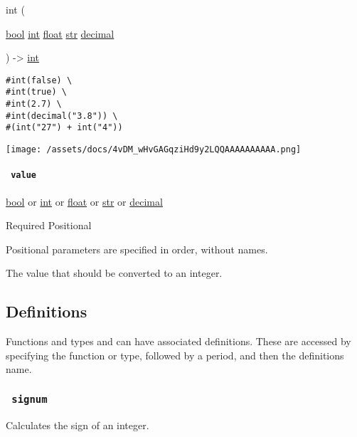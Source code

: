{ int } (

{ \href{/docs/reference/foundations/bool/}{bool}
\href{/docs/reference/foundations/int/}{int}
\href{/docs/reference/foundations/float/}{float}
\href{/docs/reference/foundations/str/}{str}
\href{/docs/reference/foundations/decimal/}{decimal} }

) -\textgreater{} \href{/docs/reference/foundations/int/}{int}

\begin{verbatim}
#int(false) \
#int(true) \
#int(2.7) \
#int(decimal("3.8")) \
#(int("27") + int("4"))
\end{verbatim}

\texttt{[image: /assets/docs/4vDM\_wHvGAGqziHd9y2LQQAAAAAAAAAA.png]}

\paragraph{\texorpdfstring{\texttt{\ value\ }}{ value }}\label{constructor-value}

\href{/docs/reference/foundations/bool/}{bool} {or}
\href{/docs/reference/foundations/int/}{int} {or}
\href{/docs/reference/foundations/float/}{float} {or}
\href{/docs/reference/foundations/str/}{str} {or}
\href{/docs/reference/foundations/decimal/}{decimal}

{Required} {{ Positional }}

\phantomsection\label{constructor-value-positional-tooltip}
Positional parameters are specified in order, without names.

The value that should be converted to an integer.

\subsection{\texorpdfstring{{ Definitions
}}{ Definitions }}\label{definitions}

\label{definitions-tooltip}
Functions and types and can have associated definitions. These are
accessed by specifying the function or type, followed by a period, and
then the definition\textquotesingle s name.

\subsubsection{\texorpdfstring{\texttt{\ signum\ }}{ signum }}\label{definitions-signum}

Calculates the sign of an integer.


